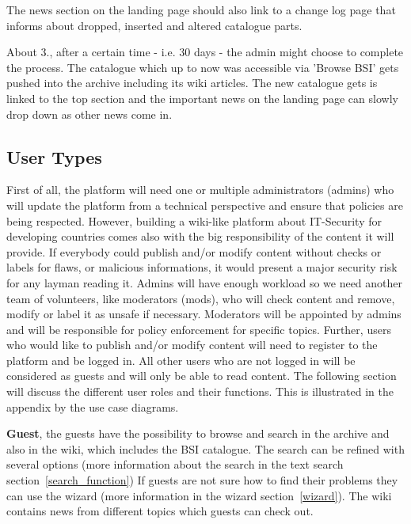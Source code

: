 \begin{tcolorbox}[breakable,colback=red!14,colframe=red!40!black,title=UPDATE 19/11/2017]
The news section on the landing page should also link to a change log page that informs about dropped, inserted and altered catalogue parts. 
\bigskip

About 3., after a certain time - i.e. 30 days - the admin might choose to complete the process.
The catalogue which up to now was accessible via 'Browse BSI' gets pushed into the archive including its wiki articles.
The new catalogue gets is linked to the top section and the important news on the landing page can slowly drop down as other news come in.
\end{tcolorbox}


\subsection{User Types} 
\label{user_types}

First of all, the platform will need one or multiple administrators (admins) who will update the platform from a technical perspective and ensure that policies are being respected. 
However, building a wiki-like platform about IT-Security for developing countries comes also with the big responsibility of the content it will provide. 
If everybody could publish and/or modify content without checks or labels for flaws, or malicious informations, it would present a major security risk for any layman reading it. 
Admins will have enough workload so we need another team of volunteers, like moderators (mods), who will check content and remove, modify or label it as unsafe if necessary. 
Moderators will be appointed by admins and will be responsible for policy enforcement for specific topics. 
Further, users who would like to publish and/or modify content will need to register to the platform and be logged in. 
All other users who are not logged in will be considered as guests and will only be able to read content. 
The following section will discuss the different user roles and their functions. 
This is illustrated in the appendix by the use case diagrams. 
\bigskip

\textbf{Guest}, the guests have the possibility to browse and search in the archive and also in the wiki, which includes the BSI catalogue. The search can be refined with several options (more information about the search in the text search section~\ref{search_function}) 
If guests are not sure how to find their problems they can use the wizard (more information in the wizard section~\ref{wizard}). 
The wiki contains news from different topics which guests can check out.
\bigskip

